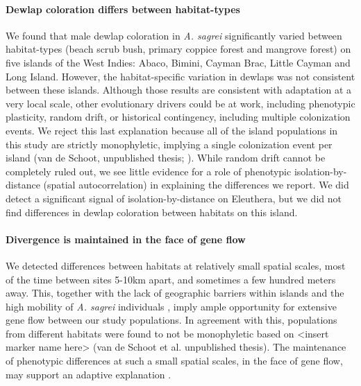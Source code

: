 

\paragraph{Dewlap coloration differs between habitat-types} We found that male dewlap coloration in \textit{A. sagrei} significantly varied between habitat-types (beach scrub bush, primary coppice forest and mangrove forest) on five islands of the West Indies: Abaco, Bimini, Cayman Brac, Little Cayman and Long Island. However, the habitat-specific variation in dewlaps was not consistent between these islands. Although those results are consistent with adaptation at a very local scale, other evolutionary drivers could be at work, including phenotypic plasticity, random drift, or historical contingency, including multiple colonization events. We reject this last explanation because all of the island populations in this study are strictly monophyletic, implying a single colonization event per island (van de Schoot, unpublished thesis; \citealt{Driessens2017, Reynolds2020}). While random drift cannot be completely ruled out, we see little evidence for a role of phenotypic isolation-by-distance (spatial autocorrelation) in explaining the differences we report. We did detect a significant signal of isolation-by-distance on Eleuthera, but we did not find differences in dewlap coloration between habitats on this island.


\paragraph{Divergence is maintained in the face of gene flow} We detected differences between habitats at relatively small spatial scales, most of the time between sites 5-10km apart, and sometimes a few hundred meters away. This, together with the lack of geographic barriers within islands and the high mobility of \textit{A. sagrei} individuals \citep{Kamath2018}, imply ample opportunity for extensive gene flow between our study populations. In agreement with this, populations from different habitats were found to not be monophyletic based on <insert marker name here> (van de Schoot et al. unpublished thesis). The maintenance of phenotypic differences at such a small spatial scales, in the face of gene flow, may support an adaptive explanation \citep{Richardson2014}.\\

